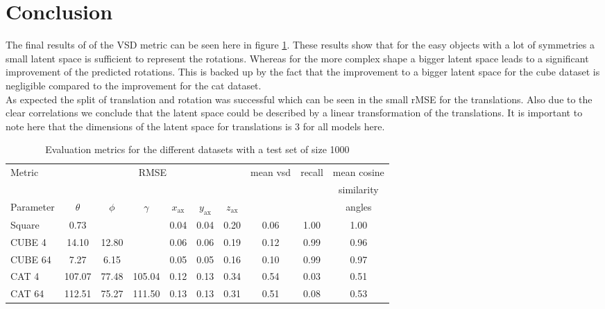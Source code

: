 \documentclass[10pt,a4paper]{article}
\begin{document}
\section{Conclusion}
The final results of of the VSD metric can be seen here in figure \ref{results}. These results show that for the easy objects with a lot of symmetries a small latent space is sufficient to represent the rotations. Whereas for the more complex shape a bigger latent space leads to a significant improvement of the predicted rotations.
This is backed up by the fact that the improvement to a bigger latent space for the cube dataset is negligible compared to the improvement for the cat dataset.\\
As expected the split of translation and rotation was successful which can be seen in the small rMSE for the translations. Also due to the clear correlations we conclude that the latent space could be described by a linear transformation of the translations. It is important to note here that the dimensions of the latent space for translations is 3 for all models here.\\
\begin{table}
    \begin{adjustbox}{width=\textwidth}
        \begin{tabular}[width = \textwidth]{lccccccccc} 
    Metric & \multicolumn{6}{c}{RMSE} & mean vsd & recall & mean cosine \\
           &&&&&&&&& similarity \\
    \hline
    Parameter & $\theta$ & $\phi$ & $\gamma$ & $x_{\text{ax}}$  &
    $y_{\text{ax}}$ & $z_{\text{ax}}$ &       &      & angles\\
\hline
Square        & 0.73     &        &          & 0.04             & 0.04            & 0.20            & 0.06  & 1.00 & 1.00 \\
CUBE 4        & 14.10    & 12.80  &          & 0.06             & 0.06
              & 0.19     & 0.12   & 0.99     & 0.96            \\
CUBE 64       & 7.27    & 6.15  &          & 0.05             & 0.05
              & 0.16     & 0.10   & 0.99     & 0.97            \\
CAT 4         & 107.07   & 77.48  & 105.04   & 0.12             & 0.13
              & 0.34     & 0.54 & 0.03 & 0.51    \\
CAT 64        & 112.51   & 75.27  & 111.50   & 0.13             & 0.13
              & 0.31     & 0.51 & 0.08 & 0.53    \\
\end{tabular}
\end{adjustbox}
\caption{Evaluation metrics for the different datasets with a test set of size 1000}
\label{results}
\end{table}
\end{document}
